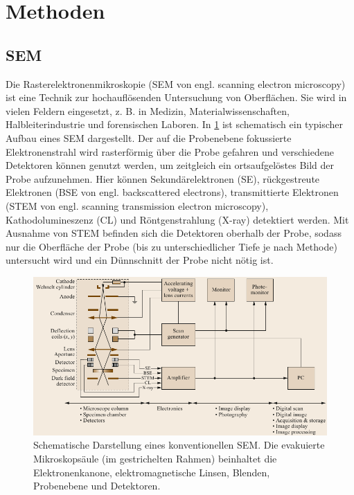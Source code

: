 \section{Methoden}

\subsection{SEM}
\label{sec:SEM}

Die Rasterelektronenmikroskopie (SEM von engl. scanning electron microscopy) ist eine Technik zur hochauflösenden Untersuchung von Oberflächen.
Sie wird in vielen Feldern eingesetzt, z. B. in Medizin, Materialwissenschaften, Halbleiterindustrie und forensischen Laboren.
In \cref{fig:sem_schematic} ist schematisch ein typischer Aufbau eines SEM dargestellt.
Der auf die Probenebene fokussierte Elektronenstrahl wird rasterförmig über die Probe gefahren und verschiedene Detektoren können genutzt werden, um zeitgleich ein ortsaufgelöstes Bild der Probe aufzunehmen.
Hier können Sekundärelektronen (SE), rückgestreute Elektronen (BSE von engl. backscattered electrons), transmittierte Elektronen (STEM von engl. scanning transmission electron microscopy), Kathodolumineszenz (CL) und Röntgenstrahlung (X-ray) detektiert werden.
Mit Ausnahme von STEM befinden sich die Detektoren oberhalb der Probe, sodass nur die Oberfläche der Probe (bis zu unterschiedlicher Tiefe je nach Methode) untersucht wird und ein Dünnschnitt der Probe nicht nötig ist.

\begin{figure}[!ht]
    \centering
    \includegraphics[width=\textwidth]{img/sem_schematic}
    \caption{
    Schematische Darstellung eines konventionellen SEM.
    Die evakuierte Mikroskopsäule (im gestrichelten Rahmen) beinhaltet die Elektronenkanone, elektromagnetische Linsen, Blenden, Probenebene und Detektoren. \cite{springer-handbook}
    }
    \label{fig:sem_schematic}
\end{figure}

